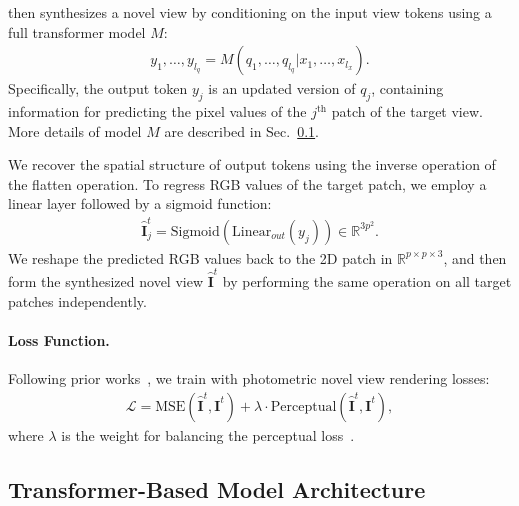 \paperName{} then synthesizes a novel view by conditioning on the input view tokens using a full transformer model $M$:
\begin{align}
    y_1, \ldots, y_\mathit{l_q} = M(q_1, \ldots, q_\mathit{l_q} | x_1, \ldots, x_\mathit{l_x}).
\end{align}
Specifically, the output token $y_j$ is an updated version of $q_j$, containing information for predicting the pixel values of the $j^{\text{th}}$ patch of the target view. More details of model $M$ are described in Sec.~\ref{sec:method_model_archs}.

We recover the spatial structure of output tokens using the inverse operation of the flatten operation. To regress RGB values of the target patch, we employ a linear layer followed by a sigmoid function:
\begin{align}
    \hat{\mathbf{I}}_{j}^t = \text{Sigmoid}{(\text{Linear}_{out}(y_{j}))} \in \mathbb{R}^{3p^2}.
\end{align}
We reshape the predicted RGB values back to the 2D patch in $\mathbb{R}^{p\times p \times 3}$, and then form the synthesized novel view $\hat{\mathbf{I}}^t$ by performing the same operation on all target patches independently.


\paragraph{Loss Function.}

Following prior works~\citep{zhang2024gslrmlargereconstructionmodel, hong2024lrmlargereconstructionmodel}, we train \paperName{} with photometric novel view rendering losses:
\begin{align}
    \mathcal{L} = \text{MSE}(\hat{\mathbf{I}}^t, \mathbf{I}^t) + \lambda \cdot \text{Perceptual}(\hat{\mathbf{I}}^t, \mathbf{I}^t),
\end{align}
where $\lambda$ is the weight for balancing the perceptual loss~\citep{johnson2016perceptual}.



\subsection{Transformer-Based Model Architecture}
\label{sec:method_model_archs}

